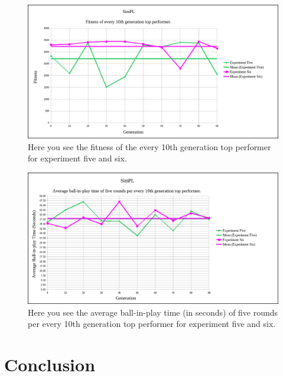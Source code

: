 \documentclass[a4paper,10pt]{article}
\begin{document}
\begin{figure}[H]  
  \centering
  \includegraphics[width=1\textwidth]{figures/exp56_10_tops.png}
  \caption{Here you see the fitness of the every 10th generation top performer for experiment five and six.}
  \label{fig:exp56_10_tops}
\end{figure}

\begin{figure}[H]  
  \centering
  \includegraphics[width=1\textwidth]{figures/exp56_10_tops_times.png}
  \caption{Here you see the average ball-in-play time (in seconds) of five rounds per every 10th generation top performer for experiment five and six.}
  \label{fig:exp56_10_tops_times}
\end{figure}

\section{Conclusion}
\end{document}
